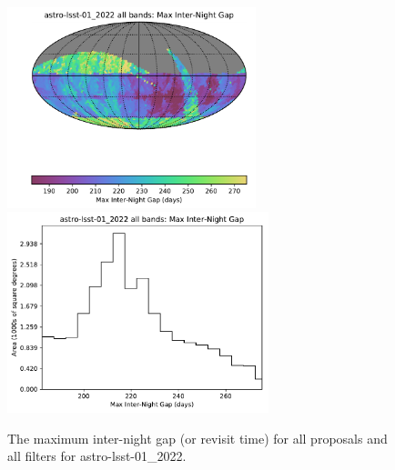 \documentclass[DM,authoryear,toc]{lsstdoc}
\begin{document}
\begin{figure}[htb]
\centering
\vskip -0.0in
\includegraphics[height=2.3in]{figures/astro-lsst-01_2022_Max_Inter-Night_Gap_all_bands_HEAL_SkyMap.pdf}
\includegraphics[height=2.3in]{figures/astro-lsst-01_2022_Max_Inter-Night_Gap_all_bands_HEAL_Histogram.pdf}
\vskip -0.1in
\caption{The maximum inter-night gap (or revisit time) for all proposals and all filters for astro-lsst-01\_2022.}
\label{fig:baseline_MAXGapAll}
\end{figure}




\end{document}
